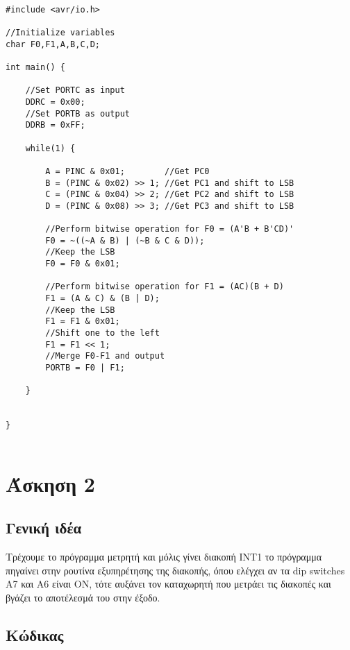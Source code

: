 \documentclass[11pt]{article}
\begin{document}
\begin{verbatim}

#include <avr/io.h>

//Initialize variables
char F0,F1,A,B,C,D;

int main() {
	
	//Set PORTC as input
	DDRC = 0x00;
	//Set PORTB as output
	DDRB = 0xFF;
	
	while(1) {
		
		A = PINC & 0x01;		//Get PC0
		B = (PINC & 0x02) >> 1; //Get PC1 and shift to LSB
		C = (PINC & 0x04) >> 2;	//Get PC2 and shift to LSB
		D = (PINC & 0x08) >> 3;	//Get PC3 and shift to LSB
		
		//Perform bitwise operation for F0 = (A'B + B'CD)'
		F0 = ~((~A & B) | (~B & C & D));
		//Keep the LSB
		F0 = F0 & 0x01;
		
		//Perform bitwise operation for F1 = (AC)(B + D)
		F1 = (A & C) & (B | D);
		//Keep the LSB
		F1 = F1 & 0x01;
		//Shift one to the left
		F1 = F1 << 1;
		//Merge F0-F1 and output
		PORTB = F0 | F1;
		
	}
	
	
}
	
\end{verbatim}

\section*{Άσκηση 2}

\subsection*{Γενική ιδέα}
Τρέχουμε το πρόγραμμα μετρητή και μόλις γίνει διακοπή INT1 το πρόγραμμα πηγαίνει στην ρουτίνα εξυπηρέτησης της διακοπής, όπου ελέγχει αν τα dip switches A7 και Α6 είναι ON, τότε αυξάνει τον καταχωρητή που μετράει τις διακοπές και βγάζει το αποτέλεσμά του στην έξοδο.

\subsection*{Κώδικας}
\end{document}
